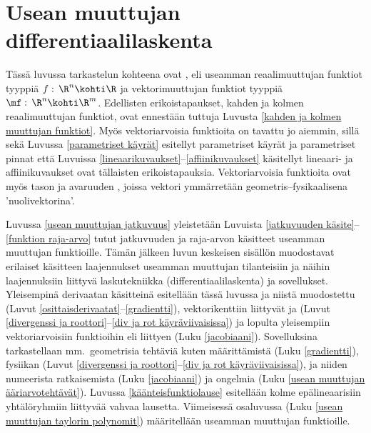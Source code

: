 \chapter[Usean muuttujan differentiaalilaskenta]{Usean muuttujan \\ 
differentiaalilaskenta}

Tässä luvussa tarkastelun kohteena ovat , eli useamman reaalimuuttujan
funktiot tyyppiä $f:\,\R^n\kohti\R$ ja vektorimuuttujan  funktiot
tyyppiä $\mf:\,\R^n\kohti\R^m$. Edellisten erikoistapaukset, kahden ja kolmen
\mbox{reaalimuuttujan} funktiot, ovat ennestään tuttuja Luvusta
\ref{kahden ja kolmen muuttujan funktiot}. Myös vektoriarvoisia funktioita on tavattu jo
aiemmin, sillä sekä Luvussa \ref{parametriset käyrät} esitellyt parametriset käyrät ja
parametriset pinnat että Luvuissa \ref{lineaarikuvaukset}--\ref{affiinikuvaukset} käsitellyt
lineaari- ja affiinikuvaukset ovat tällaisten erikoistapauksia. Vektoriarvoisia funktioita ovat
myös tason ja avaruuden , joissa vektori ymmärretään
geometris--fysikaalisena 'nuolivektorina'.

Luvussa \ref{usean muuttujan jatkuvuus} yleistetään Luvuista
\ref{jatkuvuuden käsite}--\ref{funktion raja-arvo} tutut jatkuvuuden ja raja-arvon käsitteet
useamman muuttujan funktioille. Tämän jälkeen luvun keskeisen sisällön muodostavat erilaiset
 käsitteen laajennukset useamman muuttujan tilanteisiin ja näihin
laajennuksiin liittyvä laskutekniikka (differentiaalilaskenta) ja sovellukset. Yleisempinä
derivaatan käsitteinä esitellään tässä luvussa  ja niistä muodostettu
 (Luvut \ref{osittaisderivaatat}--\ref{gradientti}), vektorikenttiin liittyvät
 ja 
(Luvut \ref{divergenssi ja roottori}--\ref{div ja rot käyräviivaisissa}) ja lopulta yleisempiin
vektoriarvoisiin funktioihin eli  liittyen 
 (Luku \ref{jacobiaani}). Sovelluksina tarkastellaan mm.\ geometrisia
tehtäviä kuten  määrittämistä (Luku \ref{gradientti}), fysiikan 
(Luvut \ref{divergenssi ja roottori}--\ref{div ja rot käyräviivaisissa}), 
 ja niiden numeerista ratkaisemista (Luku \ref{jacobiaani})
ja  ongelmia (Luku \ref{usean muuttujan ääriarvotehtävät}). Luvussa
\ref{käänteisfunktiolause} esitellään kolme epälineaarisiin yhtälöryhmiin liittyvää
 vahvaa lausetta. Viimeisessä osaluvussa
(Luku \ref{usean muuttujan taylorin polynomit}) määritellään  useamman
muuttujan funktioille. 
